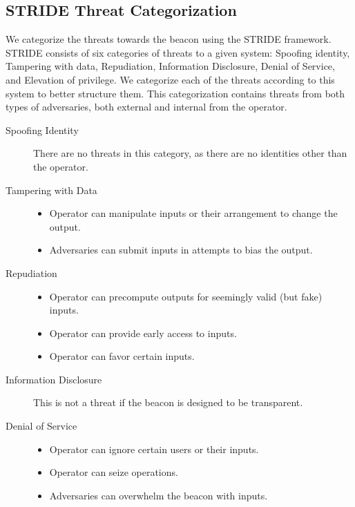 \subsection{STRIDE Threat Categorization}
We categorize the threats towards the beacon using the STRIDE framework. STRIDE consists of six categories of threats to a given system: Spoofing identity, Tampering with data, Repudiation, Information Disclosure, Denial of Service, and Elevation of privilege. We categorize each of the threats according to this system to better structure them. This categorization contains threats from both types of adversaries, both external and internal from the operator.

\begin{description}
    \item [Spoofing Identity] There are no threats in this category, as there are no identities other than the operator.
    \item [Tampering with Data] \begin{itemize}
                                    \item Operator can manipulate inputs or their arrangement to change the output.
                                    \item Adversaries can submit inputs in attempts to bias the output.
                                \end{itemize}
    \item [Repudiation] \begin{itemize}
                            \item Operator can precompute outputs for seemingly valid (but fake) inputs.
                            \item Operator can provide early access to inputs.
                            \item Operator can favor certain inputs.
                        \end{itemize}
    \item [Information Disclosure] This is not a threat if the beacon is designed to be transparent.
    \item [Denial of Service] \begin{itemize}
                                \item Operator can ignore certain users or their inputs.
                                \item Operator can seize operations.
                                \item Adversaries can overwhelm the beacon with inputs.

\end{itemize}
\end{description}
